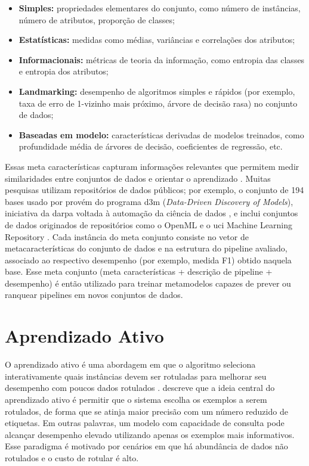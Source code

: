\begin{itemize}
  \item \textbf{Simples:} propriedades elementares do conjunto, como número de instâncias, número de atributos, proporção de classes;
  \item \textbf{Estatísticas:} medidas como médias, variâncias e correlações dos atributos;
  \item \textbf{Informacionais:} métricas de teoria da informação, como entropia das classes e entropia dos atributos;
  \item \textbf{Landmarking:} desempenho de algoritmos simples e rápidos (por exemplo, taxa de erro de 1-vizinho mais próximo, árvore de decisão rasa) no conjunto de dados;
  \item \textbf{Baseadas em modelo:} características derivadas de modelos treinados, como profundidade média de árvores de decisão, coeficientes de regressão, etc.
\end{itemize}

Essas meta características capturam informações relevantes que permitem medir similaridades entre conjuntos de dados e orientar o aprendizado . Muitas pesquisas utilizam repositórios de dados públicos; por exemplo, o conjunto de 194 bases usado por  provém do programa \gls{d3m} (\textit{Data-Driven Discovery of Models}), iniciativa da \gls{darpa} voltada à automação da ciência de dados , e inclui conjuntos de dados originados de repositórios como o OpenML  e o \gls{uci} Machine Learning Repository \cite{Dua2019}. Cada instância do meta conjunto consiste no vetor de metacaracterísticas do conjunto de dados e na estrutura do pipeline avaliado, associado ao respectivo desempenho (por exemplo, medida F1) obtido naquela base. Esse meta conjunto (meta características + descrição de pipeline + desempenho) é então utilizado para treinar metamodelos capazes de prever ou ranquear pipelines em novos conjuntos de dados.

\section{Aprendizado Ativo}

O aprendizado ativo é uma abordagem em que o algoritmo seleciona interativamente quais instâncias devem ser rotuladas para melhorar seu desempenho com poucos dados rotulados .  descreve que a ideia central do aprendizado ativo é permitir que o sistema escolha os exemplos a serem rotulados, de forma que se atinja maior precisão com um número reduzido de etiquetas. Em outras palavras, um modelo com capacidade de consulta pode alcançar desempenho elevado utilizando apenas os exemplos mais informativos. Esse paradigma é motivado por cenários em que há abundância de dados não rotulados e o custo de rotular é alto.

